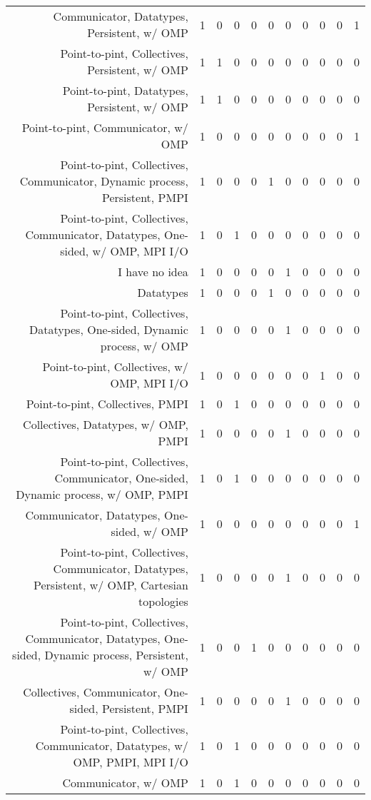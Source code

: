{\begin{landscape}
\begin{longtable}[htb]{r|c|c|c|c|c|c|c|c|c|c}
{Communicator, Datatypes, Persistent, w/ OMP} & 1 & 0 & 0 & 0 & 0 & 0 & 0 & 0 & 0 & 1 \\%
{Point-to-pint, Collectives, Persistent, w/ OMP} & 1 & 1 & 0 & 0 & 0 & 0 & 0 & 0 & 0 & 0 \\%
{Point-to-pint, Datatypes, Persistent, w/ OMP} & 1 & 1 & 0 & 0 & 0 & 0 & 0 & 0 & 0 & 0 \\%
{Point-to-pint, Communicator, w/ OMP} & 1 & 0 & 0 & 0 & 0 & 0 & 0 & 0 & 0 & 1 \\%
{Point-to-pint, Collectives, Communicator, Dynamic process, Persistent, PMPI} & 1 & 0 & 0 & 0 & 1 & 0 & 0 & 0 & 0 & 0 \\%
{Point-to-pint, Collectives, Communicator, Datatypes, One-sided, w/ OMP, MPI I/O} & 1 & 0 & 1 & 0 & 0 & 0 & 0 & 0 & 0 & 0 \\%
{I have no idea} & 1 & 0 & 0 & 0 & 0 & 1 & 0 & 0 & 0 & 0 \\%
{Datatypes} & 1 & 0 & 0 & 0 & 1 & 0 & 0 & 0 & 0 & 0 \\%
{Point-to-pint, Collectives, Datatypes, One-sided, Dynamic process, w/ OMP} & 1 & 0 & 0 & 0 & 0 & 1 & 0 & 0 & 0 & 0 \\%
{Point-to-pint, Collectives, w/ OMP, MPI I/O} & 1 & 0 & 0 & 0 & 0 & 0 & 0 & 1 & 0 & 0 \\%
{Point-to-pint, Collectives, PMPI} & 1 & 0 & 1 & 0 & 0 & 0 & 0 & 0 & 0 & 0 \\%
{Collectives, Datatypes, w/ OMP, PMPI} & 1 & 0 & 0 & 0 & 0 & 1 & 0 & 0 & 0 & 0 \\%
{Point-to-pint, Collectives, Communicator, One-sided, Dynamic process, w/ OMP, PMPI} & 1 & 0 & 1 & 0 & 0 & 0 & 0 & 0 & 0 & 0 \\%
{Communicator, Datatypes, One-sided, w/ OMP} & 1 & 0 & 0 & 0 & 0 & 0 & 0 & 0 & 0 & 1 \\%
{Point-to-pint, Collectives, Communicator, Datatypes, Persistent, w/ OMP, Cartesian topologies} & 1 & 0 & 0 & 0 & 0 & 1 & 0 & 0 & 0 & 0 \\%
{Point-to-pint, Collectives, Communicator, Datatypes, One-sided, Dynamic process, Persistent, w/ OMP} & 1 & 0 & 0 & 1 & 0 & 0 & 0 & 0 & 0 & 0 \\%
{Collectives, Communicator, One-sided, Persistent, PMPI} & 1 & 0 & 0 & 0 & 0 & 1 & 0 & 0 & 0 & 0 \\%
{Point-to-pint, Collectives, Communicator, Datatypes, w/ OMP, PMPI, MPI I/O} & 1 & 0 & 1 & 0 & 0 & 0 & 0 & 0 & 0 & 0 \\%
{Communicator, w/ OMP} & 1 & 0 & 1 & 0 & 0 & 0 & 0 & 0 & 0 & 0 \\%

\end{longtable}
\end{landscape}}
